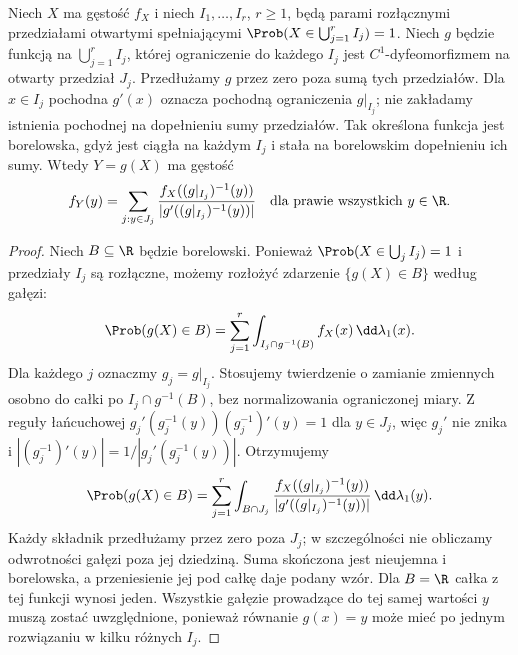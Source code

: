 \begin{stwierdzenie}
Niech $X$ ma gęstość $f_X$ i niech $I_1,\ldots,I_r$,
$r\geq1$, będą parami rozłącznymi przedziałami otwartymi
spełniającymi $\Prob(X\in\bigcup_{j=1}^r I_j)=1$.
Niech $g$ będzie funkcją na $\bigcup_{j=1}^r I_j$, której
ograniczenie do każdego $I_j$ jest $C^1$-dyfeomorfizmem
na otwarty przedział $J_j$.
Przedłużamy $g$ przez zero poza sumą tych przedziałów.
Dla $x\in I_j$ pochodna $g'(x)$ oznacza pochodną
ograniczenia $g|_{I_j}$; nie zakładamy istnienia pochodnej
na dopełnieniu sumy przedziałów.
Tak określona funkcja jest borelowska, gdyż jest ciągła
na każdym $I_j$ i stała na borelowskim dopełnieniu ich sumy.
Wtedy $Y=g(X)$ ma gęstość
\[
f_Y(y)=\sum_{j:y\in J_j}
\frac{f_X((g|_{I_j})^{-1}(y))}
{|g'((g|_{I_j})^{-1}(y))|}
\quad\text{dla prawie wszystkich }y\in\R.
\]
\end{stwierdzenie}
\begin{proof}
Niech $B\subseteq\R$ będzie borelowski. Ponieważ
$\Prob(X\in\bigcup_j I_j)=1$ i przedziały $I_j$
są rozłączne, możemy rozłożyć zdarzenie $\{g(X)\in B\}$
według gałęzi:
\[
\Prob(g(X)\in B)=\sum_{j=1}^r
\int_{I_j\cap g^{-1}(B)} f_X(x)\,\dd\lambda_1(x).
\]
Dla każdego $j$ oznaczmy $g_j=g|_{I_j}$.
Stosujemy twierdzenie o zamianie zmiennych osobno do
całki po $I_j\cap g^{-1}(B)$, bez normalizowania
ograniczonej miary. Z reguły łańcuchowej
$g_j'(g_j^{-1}(y))(g_j^{-1})'(y)=1$ dla $y\in J_j$,
więc $g_j'$ nie znika i
$|(g_j^{-1})'(y)|=1/|g_j'(g_j^{-1}(y))|$.
Otrzymujemy
\[
\Prob(g(X)\in B)=\sum_{j=1}^r
\int_{B\cap J_j}
\frac{f_X((g|_{I_j})^{-1}(y))}
{|g'((g|_{I_j})^{-1}(y))|}\,\dd\lambda_1(y).
\]
Każdy składnik przedłużamy przez zero poza $J_j$;
w szczególności nie obliczamy odwrotności gałęzi poza jej
dziedziną. Suma skończona jest nieujemna i borelowska,
a przeniesienie jej pod całkę daje podany wzór.
Dla $B=\R$ całka z tej funkcji wynosi jeden.
Wszystkie gałęzie prowadzące do tej samej wartości $y$
muszą zostać uwzględnione, ponieważ równanie $g(x)=y$
może mieć po jednym rozwiązaniu w kilku różnych $I_j$.
\end{proof}

